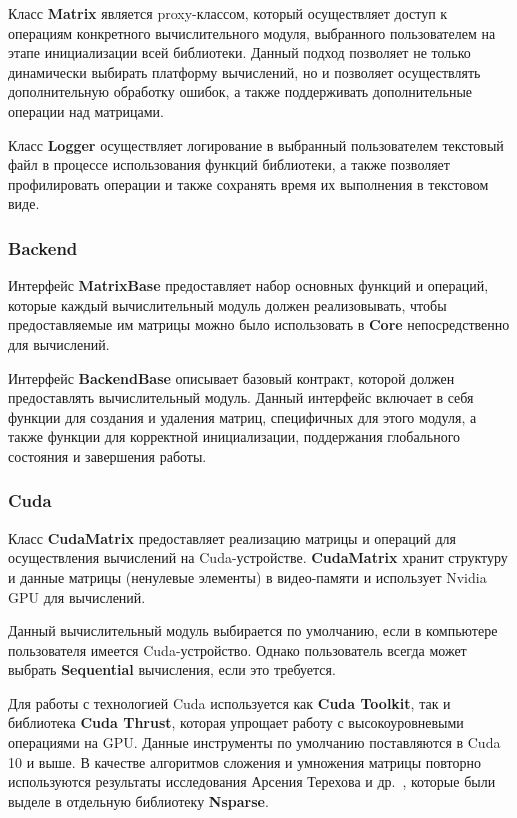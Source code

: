 Класс \textbf{Matrix} является proxy-классом, который осуществляет доступ к операциям конкретного вычислительного модуля, выбранного пользователем на этапе инициализации всей библиотеки.
Данный подход позволяет не только динамически выбирать платформу вычислений, 
но и позволяет осуществлять дополнительную обработку ошибок, 
а также поддерживать дополнительные операции над матрицами.

Класс \textbf{Logger} осуществляет логирование в выбранный пользователем текстовый файл в процессе использования функций библиотеки, а также позволяет профилировать операции и также сохранять время их выполнения в текстовом виде.

\subsubsection*{Backend}

Интерфейс \textbf{MatrixBase} предоставляет набор основных функций и операций, которые каждый вычислительный модуль должен реализовывать, чтобы предоставляемые им матрицы можно было использовать в \textbf{Core} непосредственно для вычислений.

Интерфейс \textbf{BackendBase} описывает базовый контракт, которой должен предоставлять вычислительный модуль. Данный интерфейс включает в себя функции для создания и удаления матриц, специфичных для этого модуля, а также функции для корректной инициализации, поддержания глобального состояния и завершения работы.

\subsubsection*{Cuda}

Класс \textbf{CudaMatrix} предоставляет реализацию матрицы и операций для осуществления вычислений на Cuda-устройстве. \textbf{CudaMatrix} хранит структуру и данные матрицы (ненулевые элементы) в видео-памяти и использует Nvidia GPU для вычислений. 

Данный вычислительный модуль выбирается по умолчанию, если в компьютере пользователя имеется Cuda-устройство.
Однако пользователь всегда может выбрать \textbf{Sequential} вычисления, если это требуется. 

Для работы с технологией Cuda используется как \textbf{Cuda Toolkit}, так и библиотека \textbf{Cuda Thrust}, которая упрощает работу с высокоуровневыми операциями на GPU. Данные инструменты по умолчанию поставляются в Cuda 10 и выше. В качестве алгоритмов сложения и умножения матрицы повторно используются результаты исследования Арсения Терехова и др.~\cite{inproceedings:cfqp_matrix_with_single_source}, которые были выделе в отдельную библиотеку \textbf{Nsparse}.

